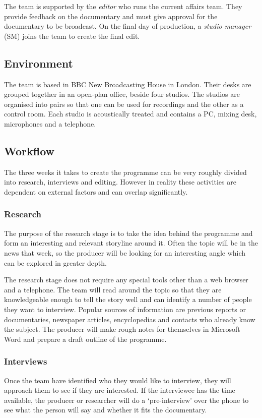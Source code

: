 The team is supported by the \textit{editor} who runs the current affairs team.
They provide feedback on the documentary and must give approval for the
documentary to be broadcast. On the final day of production, a \textit{studio
  manager} (SM) joins the team to create the final edit.

\subsection{Environment}
The team is based in BBC New Broadcasting House in London. Their desks are
grouped together in an open-plan office, beside four studios. The studios are
organised into pairs so that one can be used for recordings and the other as a
control room. Each studio is acoustically treated and contains a PC, mixing
desk, microphones and a telephone.

\subsection{Workflow}
The three weeks it takes to create the programme can be very roughly divided
into research, interviews and editing. However in reality these activities
are dependent on external factors and can overlap significantly.

\subsubsection{Research}
The purpose of the research stage is to take the idea behind the programme and
form an interesting and relevant storyline around it. Often the topic will be
in the news that week, so the producer will be looking for an interesting angle
which can be explored in greater depth.

The research stage does not require any special tools other than a web browser
and a telephone. The team will read around the topic so that they are
knowledgeable enough to tell the story well and can identify a number of
people they want to interview. Popular sources of information are previous
reports or documentaries, newspaper articles, encyclopedias and contacts who
already know the subject. The producer will make rough notes for themselves in
Microsoft Word and prepare a draft outline of the programme.

\subsubsection{Interviews}
Once the team have identified who they would like to interview, they will
approach them to see if they are interested. If the interviewee has the time
available, the producer or researcher will do a `pre-interview' over the phone
to see what the person will say and whether it fits the documentary.


